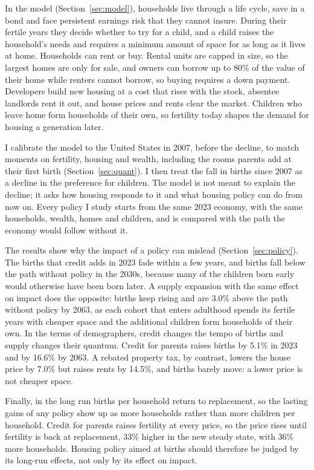 In the model (Section~\ref{sec:model}), households live through a life cycle,
save in a bond and face persistent earnings risk that they cannot insure.
During their fertile years they decide whether to try for a child, and a
child raises the household's needs and requires a minimum amount of space for
as long as it lives at home. Households can rent or buy. Rental units are
capped in size, so the largest homes are only for sale, and owners can borrow
up to 80\% of the value of their home while renters cannot borrow, so buying
requires a down payment. Developers build new housing at a cost that rises
with the stock, absentee landlords rent it out, and house prices and rents
clear the market. Children who leave home form households of their own, so
fertility today shapes the demand for housing a generation later.

I calibrate the model to the United States in 2007, before the decline, to
match moments on fertility, housing and wealth, including the rooms parents
add at their first birth (Section~\ref{sec:quant}). I then treat the fall in
births since 2007 as a decline in the preference for children. The model is
not meant to explain the decline; it asks how housing responds to it and what
housing policy can do from now on. Every policy I study starts from the same
2023 economy, with the same households, wealth, homes and children, and is
compared with the path the economy would follow without it.

The results show why the impact of a policy can mislead
(Section~\ref{sec:policy}). The births that credit adds in 2023 fade within a
few years, and births fall below the path without policy in the 2030s,
because many of the children born early would otherwise have been born later.
A supply expansion with the same effect on impact does the opposite: births
keep rising and are 3.0\% above the path without policy by 2063, as each
cohort that enters adulthood spends its fertile years with cheaper space and
the additional children form households of their own. In the terms of
demographers, credit changes the tempo of births and supply changes their
quantum. Credit for parents raises births by 5.1\% in 2023 and by 16.6\% by
2063. A rebated property tax, by contrast, lowers the house price by 7.0\%
but raises rents by 14.5\%, and births barely move: a lower price is not
cheaper space.

Finally, in the long run births per household return to replacement, so the
lasting gains of any policy show up as more households rather than more
children per household. Credit for parents raises fertility at every price,
so the price rises until fertility is back at replacement, 33\% higher in the
new steady state, with 36\% more households. Housing policy aimed at births
should therefore be judged by its long-run effects, not only by its effect on
impact.


